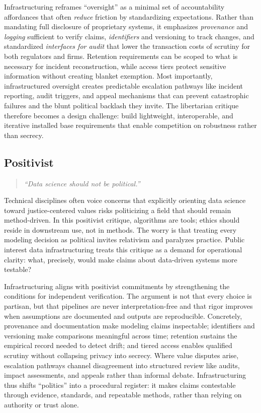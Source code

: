 \documentclass[acmsmall,screen]{acmart}
\begin{document}
Infrastructuring reframes ``oversight'' as a minimal set of accountability affordances that often \emph{reduce} friction by standardizing expectations. Rather than mandating full disclosure of proprietary systems, it emphasizes \emph{provenance} and \emph{logging} sufficient to verify claims, \emph{identifiers} and versioning to track changes, and standardized \emph{interfaces for audit} that lower the transaction costs of scrutiny for both regulators and firms. Retention requirements can be scoped to what is necessary for incident reconstruction, while access tiers protect sensitive information without creating blanket exemption. Most importantly, infrastructured oversight creates predictable escalation pathways like incident reporting, audit triggers, and appeal mechanisms that can prevent catastrophic failures and the blunt political backlash they invite. The libertarian critique therefore becomes a design challenge: build lightweight, interoperable, and iterative installed base requirements that enable competition on robustness rather than secrecy.

\subsection*{Positivist}
\begin{quote}\centering
\textit{``Data science should not be political.''}
\end{quote}

\noindent Technical disciplines often voice concerns that explicitly orienting data science toward justice-centered values risks politicizing a field that should remain method-driven. In this positivist critique, algorithms are tools; ethics should reside in downstream use, not in methods. The worry is that treating every modeling decision as political invites relativism and paralyzes practice. Public interest data infrastructuring treats this critique as a demand for operational clarity: what, precisely, would make claims about data-driven systems more testable?

Infrastructuring aligns with positivist commitments by strengthening the conditions for independent verification. The argument is not that every choice is partisan, but that pipelines are never interpretation-free and that rigor improves when assumptions are documented and outputs are reproducible. Concretely, provenance and documentation make modeling claims inspectable; identifiers and versioning make comparisons meaningful across time; retention sustains the empirical record needed to detect drift; and tiered access enables qualified scrutiny without collapsing privacy into secrecy. Where value disputes arise, escalation pathways channel disagreement into structured review like audits, impact assessments, and appeals rather than informal debate. Infrastructuring thus shifts ``politics'' into a procedural register: it makes claims contestable through evidence, standards, and repeatable methods, rather than relying on authority or trust alone.
\end{document}
